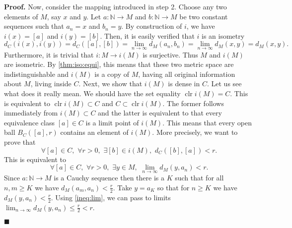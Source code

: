 \documentclass[10pt]{article}
\theoremstyle{definition}
\theoremstyle{remark}
\newenvironment{prf}{\noindent\textbf{Proof.}}{\hfill$\blacksquare$}
\DeclareMathOperator{\clr}{\text{clr}}
\begin{document}
\begin{prf}
Now, consider the mapping introduced in step 2. Choose any two elements of $M$, say $x$ and $y$. Let $a:\mathbb{N}\to M$ and $b:\mathbb{N}\to M$ be two constant sequences such that $a_n=x$ and $b_n=y$. By construction of $i$, we have $i(x)=[a]$ and $i(y)=[b]$. Then, it is easily verified that $i$ is an isometry
\begin{equation}
d_C(i(x),i(y))=d_C([a],[b])=\lim_{n\to\infty}d_M(a_n,b_n)=\lim_{n\to\infty}d_M(x,y)=d_M(x,y).
\end{equation}
Furthermore, it is trivial that $i:M\to i(M)$ is surjective. Thus $M$ and $i(M)$ are isometric. By \cref{thm:iso:equi}, this means that these two metric space are indistinguishable and $i(M)$ is a copy of $M$, having all original information about $M$, living inside $C$. Next, we show that $i(M)$ is dense in $C$. Let us see what does it really mean. We should have the set equality $\clr i(M)= C$. This is equivalent to $\clr i(M) \subset C$ and $C \subset \clr i(M)$. The former follows immediately from $i(M)\subset C$ and the latter is equivalent to that every equivalence class $[a]\in C$ is a limit point of $i(M)$. This means that every open ball $B_C([a],r)$ contains an element of $i(M)$. More precisely, we want to prove that
\begin{equation}
\forall [a]\in C,\,\,\forall r>0,\,\,\exists [b]\in i(M),\,\,d_C([b],[a])<r.
\end{equation}
This is equivalent to
\begin{equation}
\forall [a]\in C,\,\,\forall r>0,\,\,\exists y\in M,\,\,\lim_{n\to\infty}d_M(y,a_n)<r.
\end{equation}
Since $a:\mathbb{N}\to M$ is a Cauchy sequence then there is a $K$ such that for all $n,m\ge K$ we have $d_M(a_m,a_n)<\frac{r}{2}$. Take $y=a_K$ so that for $n\ge K$ we have $d_M(y,a_n)<\frac{r}{2}$. Using \cref{ineq:lim}, we can pass to limits $\lim_{n\to\infty}d_M(y,a_n)\leq \frac{r}{2} <r$.


\end{prf}
\end{document}
